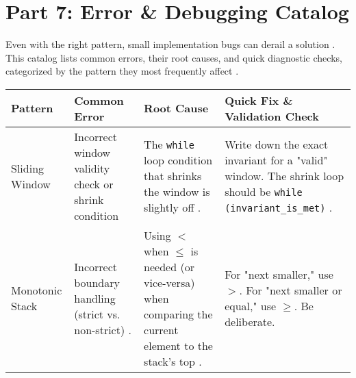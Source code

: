 \documentclass{article}
\begin{document}
\section{Part 7: Error \& Debugging Catalog}
Even with the right pattern, small implementation bugs can derail a solution \cite{1302}. This catalog lists common errors, their root causes, and quick diagnostic checks, categorized by the pattern they most frequently affect \cite{1303}.
\begin{longtable}{p{}p{}p{}p{}}
\toprule
\textbf{Pattern} & \textbf{Common Error} & \textbf{Root Cause} & \textbf{Quick Fix \& Validation Check} \\
\midrule
Sliding Window & Incorrect window validity check or shrink condition & The \texttt{while} loop condition that shrinks the window is slightly off \cite{1332}. & Write down the exact invariant for a "valid" window. The shrink loop should be \texttt{while (invariant_is_met)} \cite{1332}. \\
Monotonic Stack & Incorrect boundary handling (strict vs. non-strict) \cite{1332}. & Using $<$ when $\le$ is needed (or vice-versa) when comparing the current element to the stack's top \cite{1332}. & For "next smaller," use $>$. For "next smaller or equal," use $\ge$. Be deliberate. \\
\bottomrule
\end{longtable}
\end{document}
